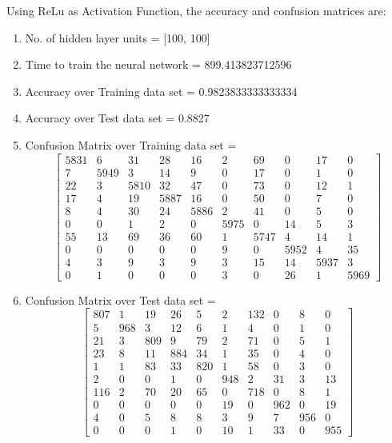 \documentclass[11pt]{article}
\begin{document}
\hline
\vspace{3mm}
Using ReLu as Activation Function, the accuracy and confusion matrices are:
\begin{enumerate}
\item No. of hidden layer units = [100, 100]
\item Time to train the neural network = 899.413823712596
\item Accuracy over Training data set = 0.9823833333333334
\item Accuracy over Test data set = 0.8827
\item Confusion Matrix over Training data set = 
\begin{equation}
  \begin{bmatrix}
5831 & 6 & 31 & 28 & 16 & 2 & 69 & 0 & 17 & 0\\
7 & 5949 & 3 & 14 & 9 & 0 & 17 & 0 & 1 & 0\\
22 & 3 & 5810 & 32 & 47 & 0 & 73 & 0 & 12 & 1\\
17 & 4 & 19 & 5887 & 16 & 0 & 50 & 0 & 7 & 0\\
8 & 4 & 30 & 24 & 5886 & 2 & 41 & 0 & 5 & 0\\
0 & 0 & 1 & 2 & 0 & 5975 & 0 & 14 & 5 & 3\\
55 & 13 & 69 & 36 & 60 & 1 & 5747 & 4 & 14 & 1\\
0 & 0 & 0 & 0 & 0 & 9 & 0 & 5952 & 4 & 35\\
4 & 3 & 9 & 3 & 9 & 3 & 15 & 14 & 5937 & 3\\
0 & 1 & 0 & 0 & 0 & 3 & 0 & 26 & 1 & 5969
  \end{bmatrix}
\end{equation}
\item Confusion Matrix over Test data set = 
\begin{equation}
  \begin{bmatrix}
807 & 1 & 19 & 26 & 5 & 2 & 132 & 0 & 8 & 0\\
5 & 968 & 3 & 12 & 6 & 1 & 4 & 0 & 1 & 0\\
21 & 3 & 809 & 9 & 79 & 2 & 71 & 0 & 5 & 1\\
23 & 8 & 11 & 884 & 34 & 1 & 35 & 0 & 4 & 0\\
1 & 1 & 83 & 33 & 820 & 1 & 58 & 0 & 3 & 0\\
2 & 0 & 0 & 1 & 0 & 948 & 2 & 31 & 3 & 13\\
116 & 2 & 70 & 20 & 65 & 0 & 718 & 0 & 8 & 1\\
0 & 0 & 0 & 0 & 0 & 19 & 0 & 962 & 0 & 19\\
4 & 0 & 5 & 8 & 8 & 3 & 9 & 7 & 956 & 0\\
0 & 0 & 0 & 1 & 0 & 10 & 1 & 33 & 0 & 955
  \end{bmatrix}
\end{equation}
\end{enumerate}
\end{document}
